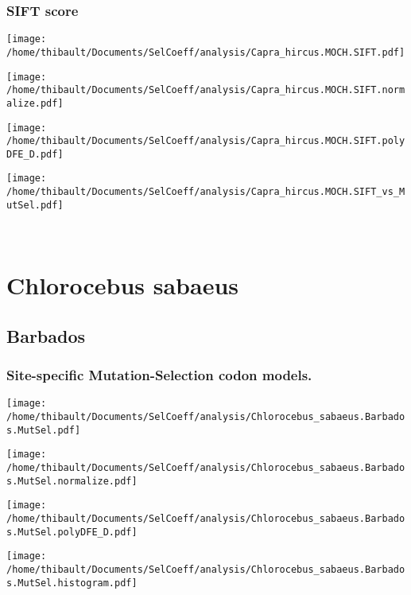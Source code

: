 \subsubsection*{SIFT score} 
\begin{minipage}{0.49\linewidth} 
\texttt{[image: /home/thibault/Documents/SelCoeff/analysis/Capra\_hircus.MOCH.SIFT.pdf]} 
\end{minipage}
\begin{minipage}{0.49\linewidth} 
\texttt{[image: /home/thibault/Documents/SelCoeff/analysis/Capra\_hircus.MOCH.SIFT.normalize.pdf]} 
\end{minipage}
\begin{minipage}{0.49\linewidth} 
\texttt{[image: /home/thibault/Documents/SelCoeff/analysis/Capra\_hircus.MOCH.SIFT.polyDFE\_D.pdf]} 
\end{minipage}
\begin{minipage}{0.49\linewidth} 
\texttt{[image: /home/thibault/Documents/SelCoeff/analysis/Capra\_hircus.MOCH.SIFT\_vs\_MutSel.pdf]} 
\end{minipage}
\\ 
\section{Chlorocebus sabaeus} 
 
\subsection{Barbados} 
 
\subsubsection*{Site-specific Mutation-Selection codon models.} 
\begin{minipage}{0.49\linewidth} 
\texttt{[image: /home/thibault/Documents/SelCoeff/analysis/Chlorocebus\_sabaeus.Barbados.MutSel.pdf]} 
\end{minipage}
\begin{minipage}{0.49\linewidth} 
\texttt{[image: /home/thibault/Documents/SelCoeff/analysis/Chlorocebus\_sabaeus.Barbados.MutSel.normalize.pdf]} 
\end{minipage}
\begin{minipage}{0.49\linewidth} 
\texttt{[image: /home/thibault/Documents/SelCoeff/analysis/Chlorocebus\_sabaeus.Barbados.MutSel.polyDFE\_D.pdf]} 
\end{minipage}
\begin{minipage}{0.49\linewidth} 
\texttt{[image: /home/thibault/Documents/SelCoeff/analysis/Chlorocebus\_sabaeus.Barbados.MutSel.histogram.pdf]} 
\end{minipage}
\\ 
